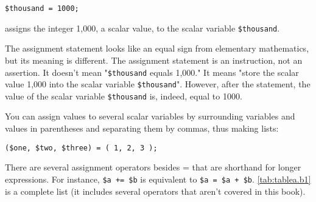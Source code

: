 \begin{lstlisting}
$thousand = 1000;
\end{lstlisting}

assigns the integer 1,000, a scalar value, to the scalar variable \verb|$thousand|.

The assignment statement looks like an equal sign from elementary mathematics, but its meaning is different. The assignment statement is an instruction, not an assertion. It doesn't mean "\verb|$thousand| equals 1,000." It means "store the scalar value 1,000 into the scalar variable \verb|$thousand|". However, after the statement, the value of the scalar variable \verb|$thousand| is, indeed, equal to 1000.

You can assign values to several scalar variables by surrounding variables and values in parentheses and separating them by commas, thus making lists:

\begin{lstlisting}
($one, $two, $three) = ( 1, 2, 3 );
\end{lstlisting}

There are several assignment operators besides = that are shorthand for longer expressions. For instance, \verb|$a += $b| is equivalent to \verb|$a = $a + $b|. \autoref{tab:tablea.b1} is a complete list (it includes several operators that aren't covered in this book).

